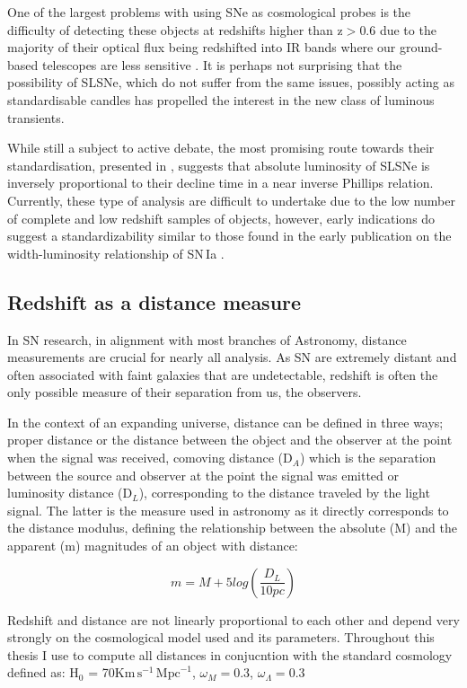 One of the largest problems with using SNe as cosmological probes is the difficulty of detecting these objects at redshifts higher than z$>$0.6 due to the majority of their optical flux being redshifted into IR bands where our ground-based telescopes are less sensitive \citep{Smith2018}. It is perhaps not surprising that the possibility of SLSNe, which do not suffer from the same issues, possibly acting as standardisable candles \citep{Inserra2014,Papadopoulus2015,Inserra2018a} has propelled the interest in the new class of luminous transients.

While still a subject to active debate, the most promising route towards their standardisation, presented in \citet{Inserra2018a}, suggests that absolute luminosity of SLSNe is inversely proportional to their decline time in a near inverse Phillips relation. Currently, these type of analysis are difficult to undertake due to the low number of complete and low redshift samples of objects, however, early indications do suggest a standardizability similar to those found in the early publication on the width-luminosity relationship of SN\,Ia \citep{Inserra2018a}.

\subsection{Redshift as a distance measure}
In SN research, in alignment with most branches of Astronomy, distance measurements are crucial for nearly all analysis. As SN are extremely distant and often associated with faint galaxies that are undetectable, redshift is often the only possible measure of their separation from us, the observers.

In the context of an expanding universe, distance can be defined in three ways; proper distance or the distance between the object and the observer at the point when the signal was received, comoving distance (D$_A$) which is the separation between the source and observer at the point the signal was emitted or luminosity distance (D$_L$), corresponding to the distance traveled by the light signal. The latter is the measure used in astronomy as it directly corresponds to the distance modulus, defining the relationship between the absolute (M) and the apparent (m) magnitudes of an object with distance:

\begin{equation}
  m = M + 5log(\frac{D_L}{10pc})
\end{equation}

Redshift and distance are not linearly proportional to each other and depend very strongly on the cosmological model used and its parameters. Throughout this thesis I use  to compute all distances in conjucntion with the standard cosmology defined as: H$_0$ = 70$\mathrm{Km}\,\mathrm{s}^{-1}\,\mathrm{Mpc}^{-1}$, $\omega_M = 0.3$, $\omega_{\Lambda} = 0.3$

